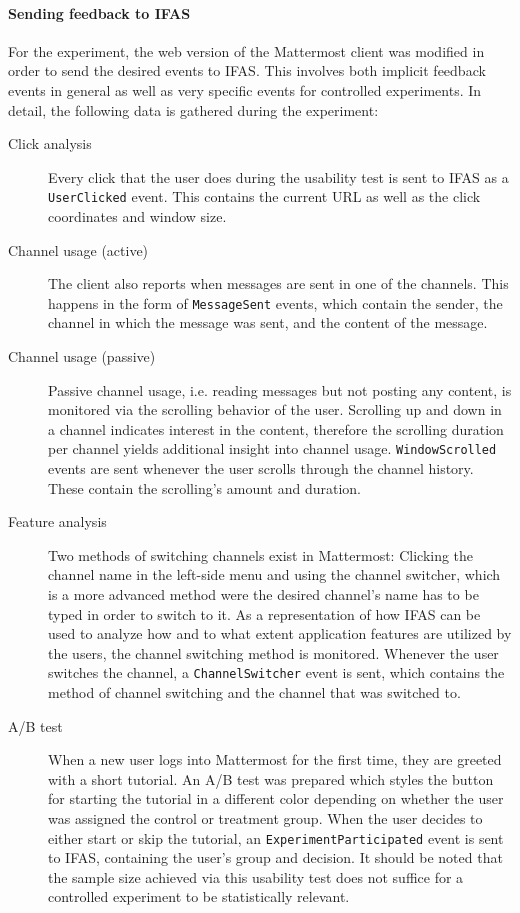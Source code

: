 \paragraph{Sending feedback to IFAS}

For the experiment, the web version of the Mattermost client was modified in order to send the desired events to \ac{IFAS}.
This involves both implicit feedback events in general as well as very specific events for controlled experiments.
In detail, the following data is gathered during the experiment:

\begin{description}
\item[Click analysis]
Every click that the user does during the usability test is sent to \ac{IFAS} as a \texttt{UserClicked} event.
This contains the current URL as well as the click coordinates and window size.
\item[Channel usage (active)]
The client also reports when messages are sent in one of the channels.
This happens in the form of \texttt{MessageSent} events, which contain the sender, the channel in which the message was sent, and the content of the message.
\item[Channel usage (passive)]
Passive channel usage, i.e. reading messages but not posting any content, is monitored via the scrolling behavior of the user.
Scrolling up and down in a channel indicates interest in the content, therefore the scrolling duration per channel yields additional insight into channel usage.
\texttt{WindowScrolled} events are sent whenever the user scrolls through the channel history.
These contain the scrolling's amount and duration.
\item[Feature analysis]
Two methods of switching channels exist in Mattermost: Clicking the channel name in the left-side menu and using the channel switcher, which is a more advanced method were the desired channel's name has to be typed in order to switch to it.
As a representation of how \ac{IFAS} can be used to analyze how and to what extent application features are utilized by the users, the channel switching method is monitored.
Whenever the user switches the channel, a \texttt{ChannelSwitcher} event is sent, which contains the method of channel switching and the channel that was switched to.
\item[A/B test]
When a new user logs into Mattermost for the first time, they are greeted with a short tutorial.
An A/B test was prepared which styles the button for starting the tutorial in a different color depending on whether the user was assigned the control or treatment group.
When the user decides to either start or skip the tutorial, an \texttt{ExperimentParticipated} event is sent to \ac{IFAS}, containing the user's group and decision.
It should be noted that the sample size achieved via this usability test does not suffice for a controlled experiment to be statistically relevant.

\end{description}

